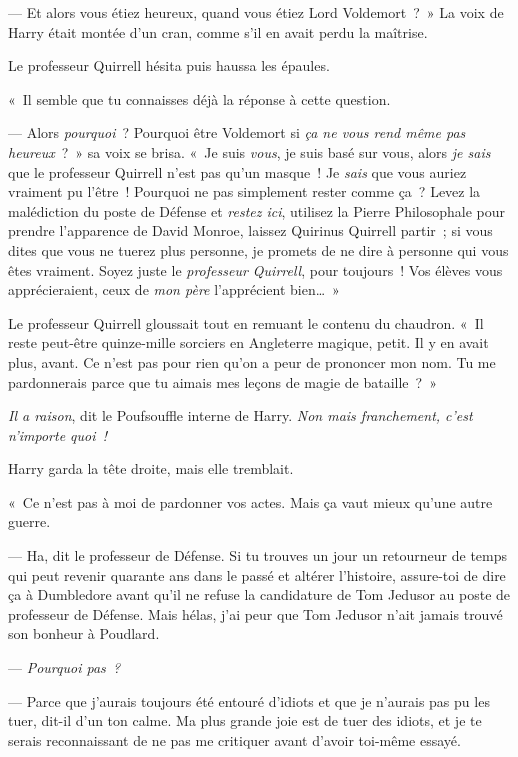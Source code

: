 --- Et alors vous étiez heureux, quand vous étiez Lord Voldemort~?~»
La voix de Harry était montée d'un cran, comme s'il en avait perdu la maîtrise.

Le professeur Quirrell hésita puis haussa les épaules.

«~Il semble que tu connaisses déjà la réponse à cette question.

--- Alors \emph{pourquoi}~?
Pourquoi être Voldemort si \emph{ça ne vous rend même pas heureux}~?~»
sa voix se brisa.
«~Je suis \emph{vous}, je suis basé sur vous, alors \emph{je sais} que le professeur Quirrell n'est pas qu'un masque~!
Je \emph{sais} que vous auriez vraiment pu l'être~!
Pourquoi ne pas simplement rester comme ça~?
Levez la malédiction du poste de Défense et \emph{restez ici}, utilisez la Pierre Philosophale pour prendre l'apparence de David Monroe, laissez Quirinus Quirrell partir~; si vous dites que vous ne tuerez plus personne, je promets de ne dire à personne qui vous êtes vraiment.
Soyez juste le \emph{professeur Quirrell}, pour toujours~!
Vos élèves vous apprécieraient, ceux de \emph{mon père} l'apprécient bien…~»

Le professeur Quirrell gloussait tout en remuant le contenu du chaudron.
«~Il reste peut-être quinze-mille sorciers en Angleterre magique, petit.
Il y en avait plus, avant.
Ce n'est pas pour rien qu'on a peur de prononcer mon nom.
Tu me pardonnerais parce que tu aimais mes leçons de magie de bataille~?~»

\emph{Il a raison}, dit le Poufsouffle interne de Harry.
\emph{Non mais franchement, c'est n'importe quoi~!}

Harry garda la tête droite, mais elle tremblait.

«~Ce n'est pas à moi de pardonner vos actes.
Mais ça vaut mieux qu'une autre guerre.

--- Ha, dit le professeur de Défense.
Si tu trouves un jour un retourneur de temps qui peut revenir quarante ans dans le passé et altérer l'histoire, assure-toi de dire ça à Dumbledore avant qu'il ne refuse la candidature de Tom Jedusor au poste de professeur de Défense.
Mais hélas, j'ai peur que Tom Jedusor n'ait jamais trouvé son bonheur à Poudlard.

--- \emph{Pourquoi pas~?}

--- Parce que j'aurais toujours été entouré d'idiots et que je n'aurais pas pu les tuer, dit-il d'un ton calme.
Ma plus grande joie est de tuer des idiots, et je te serais reconnaissant de ne pas me critiquer avant d'avoir toi-même essayé.

